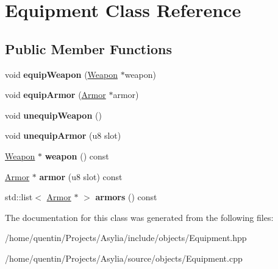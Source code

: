 \hypertarget{classEquipment}{\section{Equipment Class Reference}
\label{classEquipment}
}
\subsection*{Public Member Functions}
\begin{DoxyCompactItemize}
\item 
\hypertarget{classEquipment_a4c9b31ef451a31c0187d61affb7bd594}{void {\bfseries equip\-Weapon} (\hyperlink{classWeapon}{Weapon} $\ast$weapon)}\label{classEquipment_a4c9b31ef451a31c0187d61affb7bd594}

\item 
\hypertarget{classEquipment_a8da617d60d167111c6bfdb386942036e}{void {\bfseries equip\-Armor} (\hyperlink{classArmor}{Armor} $\ast$armor)}\label{classEquipment_a8da617d60d167111c6bfdb386942036e}

\item 
\hypertarget{classEquipment_a71a3feb2a72a0ebbdb96f7f0dda06248}{void {\bfseries unequip\-Weapon} ()}\label{classEquipment_a71a3feb2a72a0ebbdb96f7f0dda06248}

\item 
\hypertarget{classEquipment_aa3f86339d0fbfb19ab9e473a0d1288e1}{void {\bfseries unequip\-Armor} (u8 slot)}\label{classEquipment_aa3f86339d0fbfb19ab9e473a0d1288e1}

\item 
\hypertarget{classEquipment_ab40f07e983d9178710b0f018e3869bf4}{\hyperlink{classWeapon}{Weapon} $\ast$ {\bfseries weapon} () const }\label{classEquipment_ab40f07e983d9178710b0f018e3869bf4}

\item 
\hypertarget{classEquipment_a2950918369da9d2458dc817839da4691}{\hyperlink{classArmor}{Armor} $\ast$ {\bfseries armor} (u8 slot) const }\label{classEquipment_a2950918369da9d2458dc817839da4691}

\item 
\hypertarget{classEquipment_a793475bb4f5eee151711e24f4ec06a5a}{std\-::list$<$ \hyperlink{classArmor}{Armor} $\ast$ $>$ {\bfseries armors} () const }\label{classEquipment_a793475bb4f5eee151711e24f4ec06a5a}

\end{DoxyCompactItemize}


The documentation for this class was generated from the following files\-:\begin{DoxyCompactItemize}
\item 
/home/quentin/\-Projects/\-Asylia/include/objects/Equipment.\-hpp\item 
/home/quentin/\-Projects/\-Asylia/source/objects/Equipment.\-cpp\end{DoxyCompactItemize}
